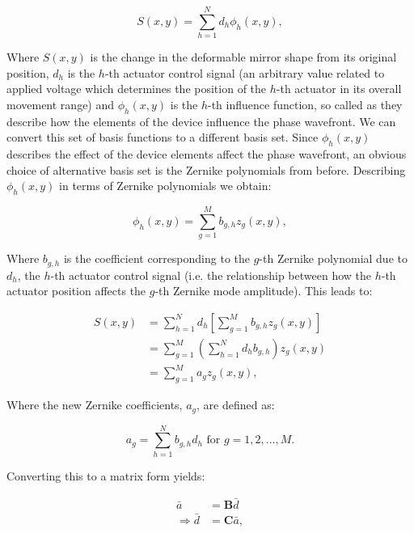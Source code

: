 \begin{equation}\label{eq:surface_shape}
S(x,y) = \sum_{h=1}^{N} d_{h}\phi_{h}(x,y),
\end{equation}

Where $S(x,y)$ is the change in the deformable mirror shape from its
original position, $d_h$ is the $h$-th actuator control signal
(an arbitrary value related to applied voltage which
determines the position of the $h$-th actuator in its overall
movement range) and $\phi_{h}(x,y)$ is the $h$-th influence
function, so called as they describe how the elements 
of the device influence the phase wavefront. We can convert
this set of basis functions to a different basis set. Since 
$\phi_{h}(x,y)$ describes the effect of the device elements affect
the phase wavefront, an obvious choice of alternative basis set is
the Zernike polynomials from before. Describing $\phi_{h}(x,y)$ in 
terms of Zernike polynomials we obtain:

\begin{equation}\label{eq:influence_to_zernike}
\phi_{h}(x,y) = \sum_{g=1}^{M} b_{g,h}z_{g}(x,y),
\end{equation}

Where $b_{g,h}$ is the coefficient corresponding to the $g$-th
Zernike polynomial due to $d_h$, the $h$-th actuator control
signal (i.e. the relationship between how the $h$-th actuator 
position affects the $g$-th Zernike mode amplitude). This leads to:

\begin{equation}\label{eq:zernike_sub}
\begin{split}
S(x,y) & = \sum_{h=1}^{N} d_{h}\left[\sum_{g=1}^{M} b_{g,h}z_{g}(x,y)\right] \\
& =\sum_{g=1}^{M} \left(\sum_{h=1}^{N} d_{h} b_{g,h}\right) z_{g}(x,y) \\
& =\sum_{g=1}^{M} a_{g} z_{g}(x,y),
\end{split}
\end{equation}

Where the new Zernike coefficients, $a_{g}$, are defined as:

\begin{equation}\label{eq:new_z_coef}
a_{g} = \sum_{h=1}^{N} b_{g,h} d_{h} \text{~for~} g=1,2,...,M.
\end{equation}

Converting this to a matrix form yields:

\begin{equation}\label{eq:CM_derivation}
\begin{split}
\bar{a} &= \boldsymbol{B} \bar{d}\\
\Rightarrow \bar{d} &= \boldsymbol{C} \bar{a},
\end{split}
\end{equation}

